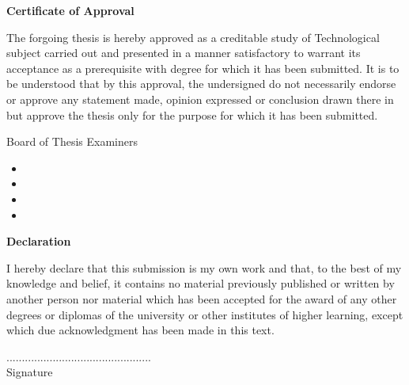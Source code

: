 \documentclass[12pt]{report}
\begin{document}
 \begin{center}
        \vspace*{1cm}
         \LARGE
        \textbf{Certificate of Approval}
        
        \vspace{1.5cm}
 \justify      
		The forgoing thesis is hereby approved as a creditable study of Technological subject carried out and presented in a manner satisfactory to warrant its acceptance as a prerequisite with degree for which it has been submitted. It is to be understood that by this approval, the undersigned do not necessarily endorse or approve any statement made, opinion expressed or conclusion drawn there in but approve the thesis only for the purpose for which it has been submitted.        
        
        \vspace{1.5cm}
        
        Board of Thesis Examiners
        
        \begin{itemize}
        \item 
        \item
        \item
        \item
        \end{itemize}
        
        \vfill
        
       
        
        
        
    \end{center}

\newpage


\begin{center}
        \vspace*{1cm}
         \LARGE
        \textbf{Declaration}
        
        \vspace{1.5cm}
 \justify      
		I hereby declare that this submission is my own work and that, to the best of my knowledge and belief, it contains no material previously published or written by another person nor material which has been accepted for the award of any other degrees or diplomas of the university or other institutes of higher learning, except which due acknowledgment has been made in this text.         
        
        \vspace{5.5cm}
        
  \begin{flushleft}
   ...............................................\\
      \hspace{2.5cm}Signature
\end{flushleft}        
      
 
        
        \vfill
        
       
        
        
        
    \end{center}
\end{document}
